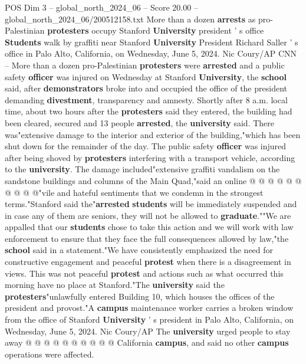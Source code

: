 \begin{textsample}{POS Dim 3 – global\_north\_2024\_06 – Score 20.00 – global\_north\_2024\_06/200512158.txt}  \label{ex:f3_pos_074}
More than a dozen \textbf{arrests} as pro-Palestinian \textbf{protesters} occupy Stanford \textbf{University} president ' s office \textbf{Students} walk by graffiti near Stanford \textbf{University} President Richard Saller ' s office in Palo Alto, California, on Wednesday, June 5, 2024.
Nic Coury/AP CNN -- More than a dozen pro-Palestinian \textbf{protesters} were \textbf{arrested} and a public safety \textbf{officer} was injured on Wednesday at Stanford \textbf{University}, the \textbf{school} said, after \textbf{demonstrators} broke into and occupied the office of the president demanding \textbf{divestment}, transparency and amnesty.
Shortly after 8 a.m. local time, about two hours after the \textbf{protesters} said they entered, the building had been cleared, secured and 13 people \textbf{arrested}, the \textbf{university} said.
There was"extensive damage to the interior and exterior of the building,"which has been shut down for the remainder of the day.
The public safety \textbf{officer} was injured after being shoved by \textbf{protesters} interfering with a transport vehicle, according to the \textbf{university}.
The damage included"extensive graffiti vandalism on the sandstone buildings and columns of the Main Quad,"said an online @ @ @ @ @ @ @ @ @ @"vile and hateful sentiments that we condemn in the strongest terms."Stanford said the"\textbf{arrested} \textbf{students} will be immediately suspended and in case any of them are seniors, they will not be allowed to \textbf{graduate}.""We are appalled that our \textbf{students} chose to take this action and we will work with law enforcement to ensure that they face the full consequences allowed by law,"the \textbf{school} said in a statement."We have consistently emphasized the need for constructive engagement and peaceful \textbf{protest} when there is a disagreement in views.
This was not peaceful \textbf{protest} and actions such as what occurred this morning have no place at Stanford."The \textbf{university} said the \textbf{protesters}"unlawfully entered Building 10, which houses the offices of the president and provost."A \textbf{campus} maintenance worker carries a broken window from the office of Stanford \textbf{University} ' s president in Palo Alto, California, on Wednesday, June 5, 2024.
Nic Coury/AP The \textbf{university} urged people to stay away @ @ @ @ @ @ @ @ @ @ California \textbf{campus}, and said no other \textbf{campus} operations were affected.

\end{textsample}
